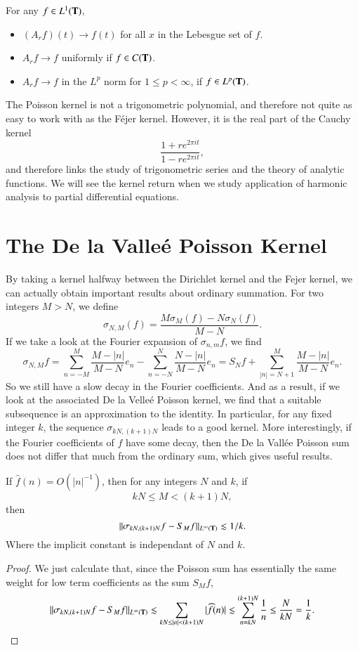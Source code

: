 \begin{theorem}
    For any $f \in L^1(\operatorname{\mathbf{T}})$,
    \begin{itemize}
        \item $(A_r f)(t) \to f(t)$ for all $x$ in the Lebesgue set of $f$.
        \item $A_r f \to f$ uniformly if $f \in C(\operatorname{\mathbf{T}})$.
        \item $A_r f \to f$ in the $L^p$ norm for $1 \leq p < \infty$, if $f \in L^p(\operatorname{\mathbf{T}})$.
    \end{itemize}
\end{theorem}

The Poisson kernel is not a trigonometric polynomial, and therefore not quite as easy to work with as the F\'{e}jer kernel. However, it is the real part of the Cauchy kernel
%
\[ \frac{1 + re^{2 \pi it}}{1 - re^{2 \pi it}}, \]
%
and therefore links the study of trigonometric series and the theory of analytic functions. We will see the kernel return when we study application of harmonic analysis to partial differential equations.

\section{The De la Valle\'{e} Poisson Kernel}

By taking a kernel halfway between the Dirichlet kernel and the Fejer kernel, we can actually obtain important results about ordinary summation. For two integers $M > N$, we define
%
\[ \sigma_{N,M}(f) = \frac{M\sigma_M(f) - N\sigma_N(f)}{M-N}. \]
%
If we take a look at the Fourier expansion of $\sigma_{n,m} f$, we find
%
\[ \sigma_{N,M} f = \sum_{n = -M}^M \frac{M - |n|}{M-N} e_n - \sum_{n = -N}^N \frac{N - |n|}{M-N} e_n = S_N f + \sum_{|n| = N+1}^M \frac{M - |n|}{M - N} e_n. \]
%
So we still have a slow decay in the Fourier coefficients. And as a result, if we look at the associated De la Velle\'{e} Poisson kernel, we find that a suitable subsequence is an approximation to the identity. In particular, for any fixed integer $k$, the sequence $\sigma_{kN,(k+1)N}$ leads to a good kernel. More interestingly, if the Fourier coefficients of $f$ have some decay, then the De la Vall\'{e}e Poisson sum does not differ that much from the ordinary sum, which gives useful results.

\begin{theorem}
    If $\widehat{f}(n) = O(|n|^{-1})$, then for any integers $N$ and $k$, if
    \[ kN \leq M < (k+1)N, \]
    then
    \[ \| \sigma_{kN,(k+1)N} f - S_M f \|_{L^\infty(\operatorname{\mathbf{T}})} \lesssim 1/k. \]
    Where the implicit constant is independant of $N$ and $k$.
\end{theorem}
\begin{proof}
    We just calculate that, since the Poisson sum has essentially the same weight for low term coefficients as the sum $S_M f$,
    \[ \| \sigma_{kN,(k+1)N} f - S_M f \|_{L^\infty(\operatorname{\mathbf{T}})} \lesssim \sum_{kN \leq |n| < (k+1)N} |\widehat{f}(n)| \lesssim \sum_{n = kN}^{(k+1)N} \frac{1}{n} \leq \frac{N}{kN} = \frac{1}{k}. \qedhere \]
\end{proof}

